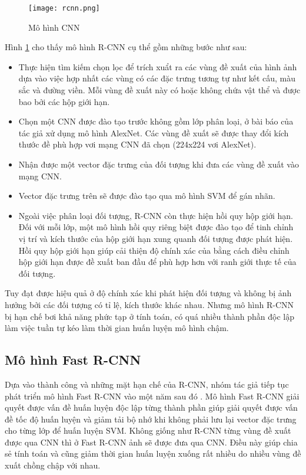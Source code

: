 \documentclass[../the.tex]{subfiles}
\begin{document}
\begin{figure}[H]
	\centering
	\texttt{[image: rcnn.png]}
	\caption{Mô hình CNN \cite{girshick2014rich}}
	\label{fig:rcnn}
\end{figure}

{\fontsize{13}{12} \selectfont
Hình \ref{fig:rcnn} cho thấy mô hình R-CNN cụ thể gồm những bước như sau:
\begin{itemize}
	\item Thực hiện tìm kiếm chọn lọc để trích xuẩt ra các vùng đề xuất của hình ảnh dựa vào việc hợp nhất các vùng có các đặc trưng tương tự như kết cấu, màu sắc và đường viền. Mỗi vùng đề xuất này có hoặc không chứa vật thể và được bao bởi các hộp giới hạn.
	\item Chọn một CNN được đào tạo trước không gồm lớp phân loại, ở bài báo của tác giả xử dụng mô hình AlexNet. Các vùng đề xuất sẽ được thay đổi kích thước đề phù hợp vơi mạng CNN đã chọn (224x224 vơi AlexNet).
	\item Nhận được một vector đặc trưng của đối tượng khi đưa các vùng đề xuất vào mạng CNN.
	\item Vector đặc trưng trên sẽ được đào tạo qua mô hình SVM để gán nhãn.
	\item Ngoài việc phân loại đối tượng, R-CNN còn thực hiện hồi quy hộp giới hạn. Đối với mỗi lớp, một mô hình hồi quy riêng biệt được đào tạo để tinh chỉnh vị trí và kích thước của hộp giới hạn xung quanh đối tượng được phát hiện. Hồi quy hộp giới hạn giúp cải thiện độ chính xác của bằng cách điều chỉnh hộp giới hạn được đề xuất ban đầu để phù hợp hơn với ranh giới thực tế của đối tượng.
\end{itemize}
}

{\fontsize{13}{12} \selectfont
Tuy đạt được hiệu quả ở độ chính xác khi phát hiện đối tượng và không bị ảnh hưởng bởi các đối tượng có tỉ lệ, kích thước khác nhau.
Nhưng mô hình R-CNN bị hạn chế bơi khả năng phức tạp ở tính toán, có quá nhiều thành phần độc lập làm việc tuần tự kéo làm thời gian huấn luyện mô hình chậm.
}

\subsection{Mô hình Fast R-CNN}

{\fontsize{13}{12} \selectfont
	Dựa vào thành công và những mặt hạn chế của R-CNN, nhóm tác giả tiếp tục phát triển mô hình Fast R-CNN vào một năm sau đó \cite{girshick2015fast}.
	Mô hình Fast R-CNN giải quyết được vấn đề huấn luyện độc lập từng thành phần giúp giải quyết được vấn đề tốc độ huấn luyện và giảm tải bộ nhớ khi không phải lưu lại vector đặc trưng cho từng lớp để huấn luyện SVM.
	Không giống như R-CNN từng vùng đề xuất được qua CNN thì ở Fast R-CNN ảnh sẽ được đưa qua CNN. Điều này giúp chia sẻ tính toán và cũng giảm thời gian huấn luyện xuống rất nhiều do nhiều vùng đề xuất chồng chập với nhau.
}
\end{document}
